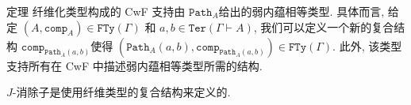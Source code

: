 \documentclass[aspectratio=169,xcolor=dvipsnames]{beamer}
\newcommand\FTy{\mathtt{FTy}}
\newcommand\comp{\mathtt{comp}}
\newcommand\Ter{\mathtt{Ter}}
\newcommand\Path{\mathtt{Path}}
\begin{document}
\begin{frame}{定理}
   纤维化类型构成的 CwF 支持由 $\Path_{A}$​ 给出的弱内蕴相等类型. 具体而言, 给定 $(A,\comp_{A})\in\FTy(\Gamma)$ 和 $a,b\in\Ter(\Gamma\vdash A)$, 我们可以定义一个新的复合结构 $\comp_{\Path_{A}(a,b)}$​ 使得 $(\Path_{A}(a,b),\comp_{\Path_{A}(a,b)})\in\FTy(\Gamma)$. 此外, 该类型支持所有在 CwF 中描述弱内蕴相等类型所需的结构.

   $J$-消除子是使用纤维类型的复合结构来定义的.
\end{frame}
\end{document}

